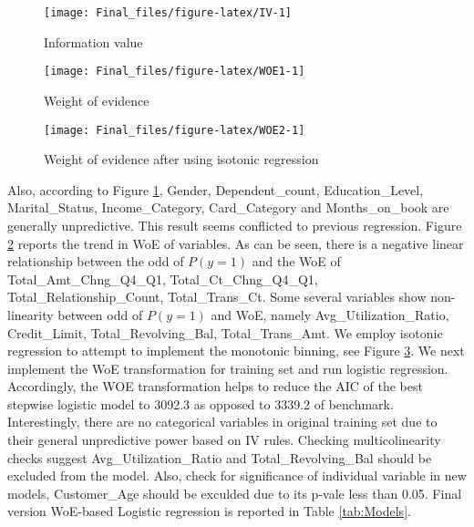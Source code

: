\begin{Schunk}
\begin{figure}

{\centering \texttt{[image: Final\_files/figure-latex/IV-1]} 

}

\caption[Information value]{Information value}\label{fig:IV}
\end{figure}
\end{Schunk}

\begin{Schunk}
\begin{figure}

{\centering \texttt{[image: Final\_files/figure-latex/WOE1-1]} 

}

\caption[Weight of evidence]{Weight of evidence}\label{fig:WOE1}
\end{figure}
\end{Schunk}

\begin{Schunk}
\begin{figure}

{\centering \texttt{[image: Final\_files/figure-latex/WOE2-1]} 

}

\caption[Weight of evidence after using isotonic regression]{Weight of evidence after using isotonic regression}\label{fig:WOE2}
\end{figure}
\end{Schunk}

Also, according to Figure \ref{fig:IV}, Gender, Dependent\_count,
Education\_Level, Marital\_Status, Income\_Category, Card\_Category and
Months\_on\_book are generally unpredictive. This result seems
conflicted to previous regression. Figure \ref{fig:WOE1} reports the
trend in WoE of variables. As can be seen, there is a negative linear
relationship between the odd of \(P(y=1)\) and the WoE of
Total\_Amt\_Chng\_Q4\_Q1, Total\_Ct\_Chng\_Q4\_Q1,
Total\_Relationship\_Count, Total\_Trans\_Ct. Some several variables
show non-linearity between odd of \(P(y=1)\) and WoE, namely
Avg\_Utilization\_Ratio, Credit\_Limit, Total\_Revolving\_Bal,
Total\_Trans\_Amt. We employ isotonic regression to attempt to implement
the monotonic binning, see Figure \ref{fig:WOE2}. We next implement the
WoE transformation for training set and run logistic regression.
Accordingly, the WOE transformation helps to reduce the AIC of the best
stepwise logistic model to 3092.3 as opposed to 3339.2 of benchmark.
Interestingly, there are no categorical variables in original training
set due to their general unpredictive power based on IV rules. Checking
multicolinearity checks suggest Avg\_Utilization\_Ratio and
Total\_Revolving\_Bal should be excluded from the model. Also, check for
significance of individual variable in new models, Customer\_Age should
be exculded due to its p-vale less than 0.05. Final version WoE-based
Logistic regression is reported in Table \ref{tab:Models}.

